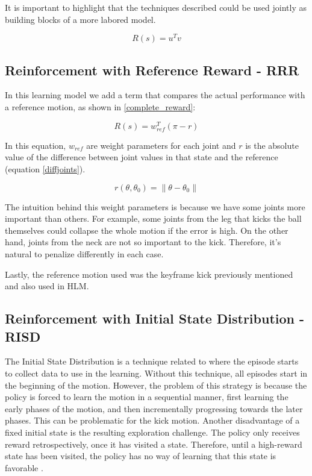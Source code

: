 It is important to highlight that the techniques described could be used jointly as building blocks of a more labored model.

\begin{equation}
R(s) = u^{T}v
\label{naive_reward}
\end{equation}

\subsection{Reinforcement with Reference Reward - RRR }
In this learning model we add a term that compares the actual performance with a reference motion, as shown in \ref{complete_reward}:

\begin{equation}
R(s) = w_{ref}^{T}(\pi - r)
\label{complete_reward}
\end{equation}

In this equation, $w_{ref}$ are weight parameters for each joint and $r$ is the absolute value of the difference between joint values in that state and the reference (equation \ref{diffjoints}).

\begin{equation}
r(\theta, \theta_{0}) = \lVert\theta - \theta_{0}\rVert
\label{diffjoints}
\end{equation}

The intuition behind this weight parameters is because we have some joints more important than others. For example, some joints from the leg that kicks the ball themselves could collapse the whole motion if the error is high. On the other hand, joints from the neck are not so important to the kick. Therefore, it's natural to penalize differently in each case.

Lastly, the reference motion used was the keyframe kick previously mentioned and also used in HLM.


\subsection{Reinforcement with Initial State Distribution - RISD}\label{risd}

The Initial State Distribution is a technique related to where the episode starts to collect data to use in the learning. Without this technique, all episodes start in the beginning of the motion. However, the problem of this strategy is because the policy is forced to learn the motion in a sequential manner, first learning the early phases of the motion, and then incrementally progressing towards the later phases. This can be problematic for the kick motion. Another disadvantage of a fixed initial state is the resulting exploration challenge. The policy only receives reward retrospectively, once it has visited a state. Therefore, until a high-reward state has been visited, the policy has no way of learning that this state is favorable \cite{peng2018}.

